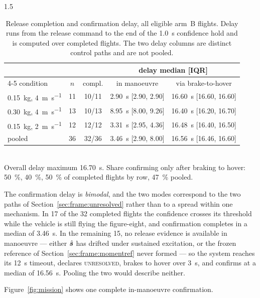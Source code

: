 \begin{spacing}{1.5}
\begin{table}[ht]
\centering
\caption{Release completion and confirmation delay, all eligible arm~B flights.
Delay runs from the release command to the end of the \SI{1.0}{\second}
confidence hold and is computed over completed flights. The two delay columns are
distinct control paths and are not pooled.}
\label{tab:complete}
\small
\begin{tabular}{@{}lcccc@{}}
\toprule
 & & & \multicolumn{2}{c}{delay median [IQR]} \\
\cmidrule(lr){4-5}
condition & $n$ & compl. & in manoeuvre & via brake-to-hover \\
\midrule
\SI{0.15}{\kg}, \SI{4}{\meter\per\second} & 11 & 10/11 & \SI{2.90}{\second} [2.90, 2.90] & \SI{16.60}{\second} [16.60, 16.60] \\
\SI{0.30}{\kg}, \SI{4}{\meter\per\second} & 13 & 10/13 & \SI{8.95}{\second} [8.00, 9.26] & \SI{16.40}{\second} [16.20, 16.70] \\
\SI{0.15}{\kg}, \SI{2}{\meter\per\second} & 12 & 12/12 & \SI{3.31}{\second} [2.95, 4.36] & \SI{16.48}{\second} [16.40, 16.50] \\
\midrule
pooled & 36 & 32/36 & \SI{3.46}{\second} [2.90, 8.00] & \SI{16.56}{\second} [16.46, 16.60] \\
\bottomrule
\end{tabular}
\\[4pt]
\footnotesize Overall delay maximum \SI{16.70}{\second}. Share confirming only
after braking to hover: \SI{50}{\percent}, \SI{40}{\percent},
\SI{50}{\percent} of completed flights by row, \SI{47}{\percent} pooled.
\end{table}

The confirmation delay is \emph{bimodal}, and the two modes correspond to the two
paths of Section~\ref{sec:frame:unresolved} rather than to a spread within one
mechanism. In 17 of the 32 completed flights the confidence crosses its threshold
while the vehicle is still flying the figure-eight, and confirmation completes in
a median of \SI{3.46}{\second}. In the remaining 15, no release evidence is
available in manoeuvre --- either $\hat{\bm{s}}$ has drifted under sustained
excitation, or the frozen reference of Section~\ref{sec:frame:momentref} never
formed --- so the system reaches its \SI{12}{\second} timeout, declares
\textsc{unresolved}, brakes to hover over \SI{3}{\second}, and confirms at a
median of \SI{16.56}{\second}. Pooling the two would describe neither.

Figure~\ref{fig:mission} shows one complete in-manoeuvre confirmation.


\end{spacing}
